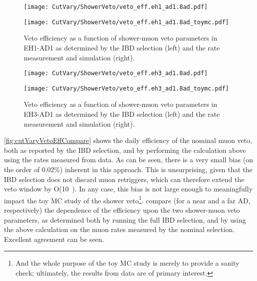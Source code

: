 \documentclass[../thesis.tex]{subfiles}
\begin{document}
\begin{figure}[ht]
  \begin{minipage}{0.5\linewidth}%
    \texttt{[image: CutVary/ShowerVeto/veto\_eff.eh1\_ad1.8ad.pdf]}%
  \end{minipage}%
  \begin{minipage}{0.5\linewidth}%
    \texttt{[image: CutVary/ShowerVeto/veto\_eff.eh1\_ad1.8ad\_toymc.pdf]}%
  \end{minipage}%
  \caption{Veto efficiency as a function of shower-muon veto parameters in EH1-AD1 as determined by the IBD selection (left) and the rate measurement and simulation (right). \marknom}
  \label{fig:cutVaryVetoEff2dNear}
\end{figure}

\begin{figure}[ht]
  \begin{minipage}{0.5\linewidth}%
    \texttt{[image: CutVary/ShowerVeto/veto\_eff.eh3\_ad1.8ad.pdf]}%
  \end{minipage}%
  \begin{minipage}{0.5\linewidth}%
    \texttt{[image: CutVary/ShowerVeto/veto\_eff.eh3\_ad1.8ad\_toymc.pdf]}%
  \end{minipage}%
  \caption{Veto efficiency as a function of shower-muon veto parameters in EH3-AD1 as determined by the IBD selection (left) and the rate measurement and simulation (right). \marknom}
  \label{fig:cutVaryVetoEff2dFar}
\end{figure}

\autoref{fig:cutVaryVetoEffCompare} shows the daily efficiency of the nominal muon veto, both as reported by the IBD selection, and by performing the calculation above using the rates measured from data. As can be seen, there is a very small bias (on the order of 0.02\%) inherent in this approach. This is unsurprising, given that the IBD selection does not discard muon retriggers, which can therefore extend the veto window by O(10~\us). In any case, this bias is not large enough to meaningfully impact the toy MC study of the shower veto\footnote{And the whole purpose of the toy MC study is merely to provide a sanity check; ultimately, the results from data are of primary interest.}.  compare (for a near and a far AD, respectively) the dependence of the efficiency upon the two shower-muon veto parameters, as determined both by running the full IBD selection, and by using the above calculation on the muon rates measured by the nominal selection. Excellent agreement can be seen.
\end{document}

